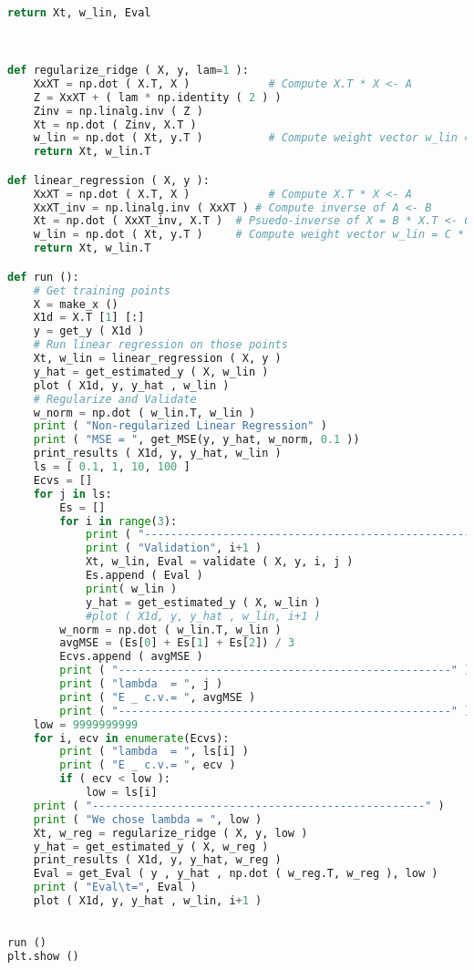 \documentclass{article}
\begin{document}
\begin{lstlisting}[language=Python,breaklines=true]
    return Xt, w_lin, Eval


    
def regularize_ridge ( X, y, lam=1 ):
    XxXT = np.dot ( X.T, X )            # Compute X.T * X <- A
    Z = XxXT + ( lam * np.identity ( 2 ) )
    Zinv = np.linalg.inv ( Z )
    Xt = np.dot ( Zinv, X.T )
    w_lin = np.dot ( Xt, y.T )          # Compute weight vector w_lin = C * y
    return Xt, w_lin.T

def linear_regression ( X, y ):
    XxXT = np.dot ( X.T, X )            # Compute X.T * X <- A
    XxXT_inv = np.linalg.inv ( XxXT ) # Compute inverse of A <- B
    Xt = np.dot ( XxXT_inv, X.T )  # Psuedo-inverse of X = B * X.T <- C
    w_lin = np.dot ( Xt, y.T )     # Compute weight vector w_lin = C * y
    return Xt, w_lin.T

def run ():
    # Get training points
    X = make_x ()
    X1d = X.T [1] [:]
    y = get_y ( X1d )
    # Run linear regression on those points
    Xt, w_lin = linear_regression ( X, y )
    y_hat = get_estimated_y ( X, w_lin )
    plot ( X1d, y, y_hat , w_lin )
    # Regularize and Validate
    w_norm = np.dot ( w_lin.T, w_lin )
    print ( "Non-regularized Linear Regression" )
    print ( "MSE = ", get_MSE(y, y_hat, w_norm, 0.1 ))
    print_results ( X1d, y, y_hat, w_lin )
    ls = [ 0.1, 1, 10, 100 ]
    Ecvs = []
    for j in ls:
        Es = []
        for i in range(3):
            print ( "---------------------------------------------------" )
            print ( "Validation", i+1 )
            Xt, w_lin, Eval = validate ( X, y, i, j )
            Es.append ( Eval )
            print( w_lin )
            y_hat = get_estimated_y ( X, w_lin )
            #plot ( X1d, y, y_hat , w_lin, i+1 )
        w_norm = np.dot ( w_lin.T, w_lin )
        avgMSE = (Es[0] + Es[1] + Es[2]) / 3
        Ecvs.append ( avgMSE )
        print ( "---------------------------------------------------" )
        print ( "lambda  = ", j )
        print ( "E _ c.v.= ", avgMSE )
        print ( "---------------------------------------------------" )
    low = 9999999999
    for i, ecv in enumerate(Ecvs):
        print ( "lambda  = ", ls[i] )
        print ( "E _ c.v.= ", ecv )
        if ( ecv < low ):
            low = ls[i]
    print ( "---------------------------------------------------" )
    print ( "We chose lambda = ", low )
    Xt, w_reg = regularize_ridge ( X, y, low )
    y_hat = get_estimated_y ( X, w_reg )
    print_results ( X1d, y, y_hat, w_reg )
    Eval = get_Eval ( y , y_hat , np.dot ( w_reg.T, w_reg ), low )
    print ( "Eval\t=", Eval )
    plot ( X1d, y, y_hat , w_lin, i+1 )

    
run ()
plt.show ()



\end{lstlisting}
\newpage
\end{document}
